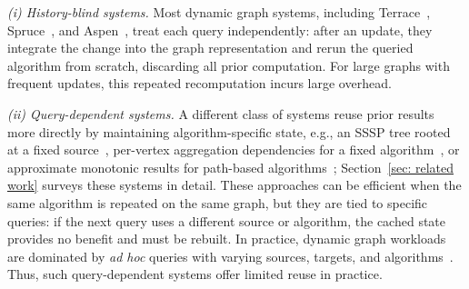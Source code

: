 \begin{fixed}
\textit{(i) History-blind systems.}
Most dynamic graph systems, including Terrace~\cite{pandey2021terrace},
Spruce~\cite{shi2024spruce}, and Aspen~\cite{dhulipala2019low}, treat each
query independently: after an update, they integrate the change into the
graph representation and rerun the queried algorithm from scratch,
discarding all prior computation. For large graphs with frequent updates,
this repeated recomputation incurs large overhead.

\textit{(ii) Query-dependent systems.}
A different class of systems reuse prior results more directly by
maintaining algorithm-specific state, e.g., an SSSP tree rooted at a fixed
source~\cite{khanda2021parallel}, per-vertex aggregation dependencies for
a fixed algorithm~\cite{mariappan2019graphbolt,mariappan2021dzig}, or
approximate monotonic results for path-based
algorithms~\cite{vora2017kickstarter}; Section~\ref{sec: related work}
surveys these systems in detail.
These approaches can be efficient when the same algorithm is repeated on
the same graph, but they are tied to specific queries: if the next query
uses a different source or algorithm, the cached state provides no
benefit and must be rebuilt.
In practice, dynamic graph workloads are dominated by \emph{ad hoc} queries
with varying sources, targets, and algorithms~\cite{Hanauer2022DynSurvey}.
Thus, such query-dependent systems offer limited reuse in practice.
\end{fixed}








